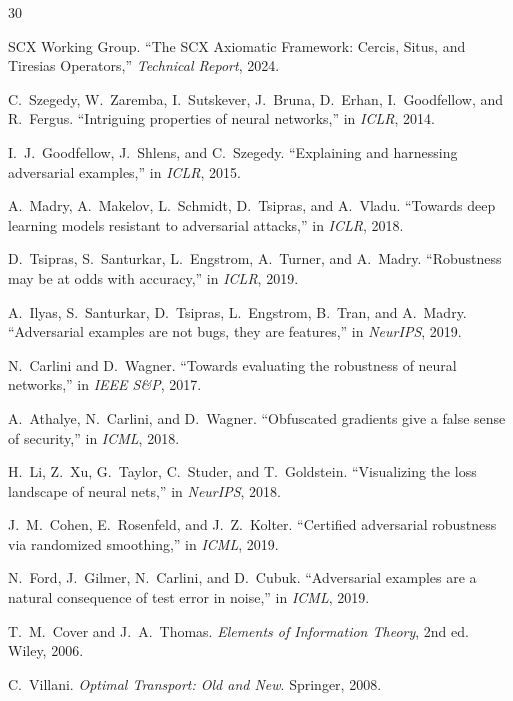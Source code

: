 \documentclass[12pt,a4paper]{article}
\begin{document}

\begin{thebibliography}{30}

SCX Working Group.
\newblock ``The SCX Axiomatic Framework: Cercis, Situs, and Tiresias
Operators,''
\newblock \emph{Technical Report}, 2024.

C.~Szegedy, W.~Zaremba, I.~Sutskever, J.~Bruna, D.~Erhan, I.~Goodfellow,
and R.~Fergus.
\newblock ``Intriguing properties of neural networks,''
\newblock in \emph{ICLR}, 2014.

I.~J.~Goodfellow, J.~Shlens, and C.~Szegedy.
\newblock ``Explaining and harnessing adversarial examples,''
\newblock in \emph{ICLR}, 2015.

A.~Madry, A.~Makelov, L.~Schmidt, D.~Tsipras, and A.~Vladu.
\newblock ``Towards deep learning models resistant to adversarial attacks,''
\newblock in \emph{ICLR}, 2018.

D.~Tsipras, S.~Santurkar, L.~Engstrom, A.~Turner, and A.~Madry.
\newblock ``Robustness may be at odds with accuracy,''
\newblock in \emph{ICLR}, 2019.

A.~Ilyas, S.~Santurkar, D.~Tsipras, L.~Engstrom, B.~Tran, and A.~Madry.
\newblock ``Adversarial examples are not bugs, they are features,''
\newblock in \emph{NeurIPS}, 2019.

N.~Carlini and D.~Wagner.
\newblock ``Towards evaluating the robustness of neural networks,''
\newblock in \emph{IEEE S\&P}, 2017.

A.~Athalye, N.~Carlini, and D.~Wagner.
\newblock ``Obfuscated gradients give a false sense of security,''
\newblock in \emph{ICML}, 2018.

H.~Li, Z.~Xu, G.~Taylor, C.~Studer, and T.~Goldstein.
\newblock ``Visualizing the loss landscape of neural nets,''
\newblock in \emph{NeurIPS}, 2018.

J.~M.~Cohen, E.~Rosenfeld, and J.~Z.~Kolter.
\newblock ``Certified adversarial robustness via randomized smoothing,''
\newblock in \emph{ICML}, 2019.

N.~Ford, J.~Gilmer, N.~Carlini, and D.~Cubuk.
\newblock ``Adversarial examples are a natural consequence of test error in
noise,''
\newblock in \emph{ICML}, 2019.

T.~M.~Cover and J.~A.~Thomas.
\newblock \emph{Elements of Information Theory}, 2nd ed.
\newblock Wiley, 2006.

C.~Villani.
\newblock \emph{Optimal Transport: Old and New}.
\newblock Springer, 2008.

\end{thebibliography}
\end{document}

